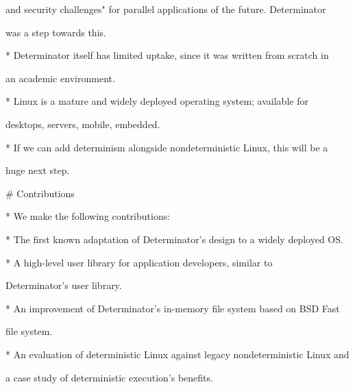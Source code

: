   and security challenges" for parallel applications of the future. Determinator

  was a step towards this.

* Determinator itself has limited uptake, since it was written from scratch in

  an academic environment.

* Linux is a mature and widely deployed operating system; available for

  desktops, servers, mobile, embedded.

* If we can add determinism alongside nondeterministic Linux, this will be a

  huge next step.



# Contributions

* We make the following contributions:

* The first known adaptation of Determinator's design to a widely deployed OS.

* A high-level user library for application developers, similar to

  Determinator's user library.

* An improvement of Determinator's in-memory file system based on BSD Fast

  file system.

* An evaluation of deterministic Linux against legacy nondeterministic Linux and

  a case study of deterministic execution's benefits.




